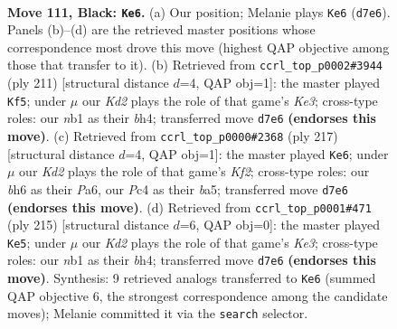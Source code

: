 \documentclass[11pt]{article}
\begin{document}
\clearpage

\begin{figure}[p]\centering
\begin{subfigure}{0.46\textwidth}\centering
\resizebox{\linewidth}{!}{%
\newchessgame
\chessboard[
  setfen={8/3k4/7B/7b/p1p5/8/5K2/1N6 b - - 77 111},
  showmover=false,
  pgfstyle=straightmove, color=movearrow, markmove={d7-e6}
]}
\caption{}
\end{subfigure}\hfill
\begin{subfigure}{0.46\textwidth}\centering
\resizebox{\linewidth}{!}{%
\newchessgame
\chessboard[
  setfen={8/1b6/4k3/7p/5p1B/8/8/6K1 b - - 59 106},
  showmover=false,
  pgfstyle=straightmove, color=movearrow, markmove={e6-f5}
]}
\caption{}
\end{subfigure}
\\[4pt]
\begin{subfigure}{0.46\textwidth}\centering
\resizebox{\linewidth}{!}{%
\newchessgame
\chessboard[
  setfen={8/3b1k2/p7/B6p/7P/K7/8/8 b - - 47 109},
  showmover=false,
  pgfstyle=straightmove, color=movearrow, markmove={f7-e6}
]}
\caption{}
\end{subfigure}\hfill
\begin{subfigure}{0.46\textwidth}\centering
\resizebox{\linewidth}{!}{%
\newchessgame
\chessboard[
  setfen={8/8/4k1p1/8/5bpB/8/6K1/8 b - - 49 108},
  showmover=false,
  pgfstyle=straightmove, color=movearrow, markmove={e6-e5}
]}
\caption{}
\end{subfigure}
\caption{\textbf{Move 111, Black: \texttt{Ke6}.} (a) Our position; Melanie plays \texttt{Ke6} (\texttt{d7e6}). Panels (b)--(d) are the retrieved master positions whose correspondence most drove this move (highest QAP objective among those that transfer to it). (b) Retrieved from \texttt{ccrl\_top\_p0002\#3944} (ply 211) [structural distance $d$=4, QAP obj=1]: the master played \texttt{Kf5}; under $\mu$ our \emph{Kd2} plays the role of that game's \emph{Ke3}; cross-type roles: our \emph{n}b1 as their \emph{b}h4; transferred move \texttt{d7e6} \textbf{(endorses this move)}. (c) Retrieved from \texttt{ccrl\_top\_p0000\#2368} (ply 217) [structural distance $d$=4, QAP obj=1]: the master played \texttt{Ke6}; under $\mu$ our \emph{Kd2} plays the role of that game's \emph{Kf2}; cross-type roles: our \emph{b}h6 as their \emph{P}a6, our \emph{P}c4 as their \emph{b}a5; transferred move \texttt{d7e6} \textbf{(endorses this move)}. (d) Retrieved from \texttt{ccrl\_top\_p0001\#471} (ply 215) [structural distance $d$=6, QAP obj=0]: the master played \texttt{Ke5}; under $\mu$ our \emph{Kd2} plays the role of that game's \emph{Ke3}; cross-type roles: our \emph{n}b1 as their \emph{b}h4; transferred move \texttt{d7e6} \textbf{(endorses this move)}. Synthesis: 9 retrieved analogs transferred to \texttt{Ke6} (summed QAP objective 6, the strongest correspondence among the candidate moves); Melanie committed it via the \texttt{search} selector.}
\label{fig:thought-m221}
\end{figure}
\end{document}
